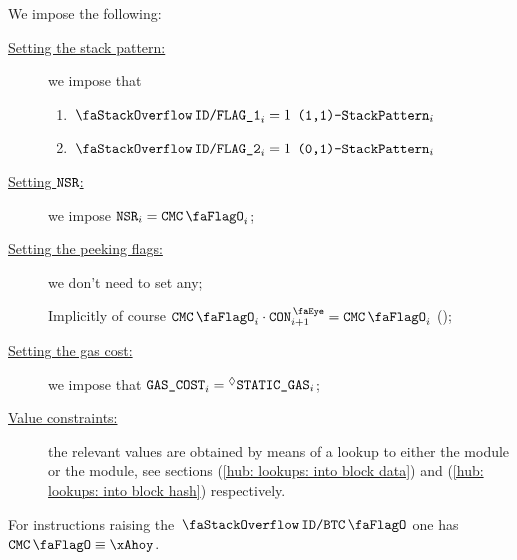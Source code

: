 \begin{center}
\end{center}
We impose the following:
\begin{description}
	\item[\underline{Setting the stack pattern:}]
		we impose that
	\begin{enumerate}
		\item \If $\decFlag{1} _{i} = 1$ \Then $\texttt{(1,1)-}\texttt{StackPattern}  _{i}$
		\item \If $\decFlag{2} _{i} = 1$ \Then $\texttt{(0,1)-}\texttt{StackPattern} _{i}$
	\end{enumerate}
	\item[\underline{Setting $\texttt{NSR}$:}]
		we impose $\nonStackRows_{i} = \cmc_{i}$;
	\item[\underline{Setting the peeking flags:}]
		we don't need to set any;

		\saNote{}
		Implicitly of course $\cmc_{i} \cdot \peekContext_{i + 1} = \cmc_{i}$ (\sanityCheck);
	\item[\underline{Setting the gas cost:}]
		we impose that $\texttt{GAS}\texttt{\_COST}_{i} = \prescript{\lozenge}{}{\texttt{STATIC\_GAS}}_{i}$;
	\item[\underline{Value constraints:}]
		the relevant values are obtained by means of a lookup to either the \btcMod{} module or the \blockHashMod{} module,
		see sections
		(\ref{hub: lookups: into block data}) and
		(\ref{hub: lookups: into block hash}) respectively.
\end{description}
\saNote{}
For instructions raising the $\stackDecBtcFlag$ one has $\cmc \equiv \xAhoy$.
